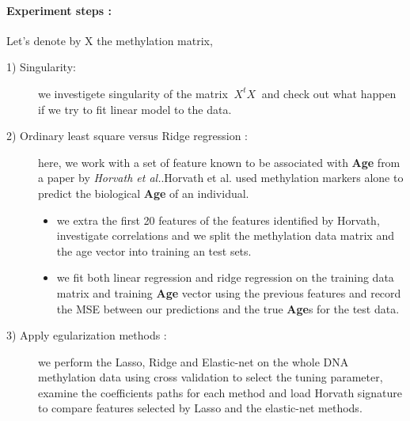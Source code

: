 \documentclass[12pt]{report}
\begin{document}
{	\paragraph{Experiment steps :} Let's denote by X the methylation matrix,
	\begin{description}
		\item[1) Singularity:] we investigete singularity of the matrix $\ X^{t}X\ $ and check out what happen if we try to fit linear model to the data.
		\item[2) Ordinary least square versus Ridge regression :] here, we work with a set of feature known to be associated with \textbf{Age} from a paper by \textit{Horvath et al.}.Horvath et al. used methylation markers alone to predict the biological \textbf{Age} of an individual.
		\begin{itemize}
			\item we extra the first 20 features of the features identified by Horvath, investigate correlations and we split the methylation data matrix and the age vector into training an test sets.
			\item we fit both linear regression and ridge regression on the training data matrix and training \textbf{Age} vector using the previous features and record the MSE between our predictions and the true \textbf{Age}s for the test data.
		\end{itemize}
		\item[3) Apply egularization methods :] we perform the Lasso, Ridge and Elastic-net on the whole DNA methylation data using cross validation to select the tuning parameter, examine the coefficients paths for each method and load Horvath signature to compare features selected by Lasso and the elastic-net methods.
\end{description}}
\end{document}
